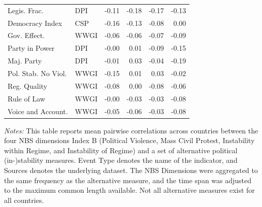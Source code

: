 \begin{table}[htbp]
\begin{minipage}{0.7\linewidth}
\begin{tabular}{llrrrr}
  Legis. Frac. & DPI & -0.11 & -0.18 & -0.17 & -0.13 \\ 
  Democracy Index & CSP & -0.16 & -0.13 & -0.08 & 0.00 \\ 
  Gov. Effect. & WWGI & -0.06 & -0.06 & -0.07 & -0.09 \\ 
  Party in Power & DPI & -0.00 & 0.01 & -0.09 & -0.15 \\ 
  Maj. Party & DPI & -0.01 & 0.03 & -0.04 & -0.19 \\ 
  Pol. Stab. No Viol. & WWGI & -0.15 & 0.01 & 0.03 & -0.02 \\ 
  Reg. Quality & WWGI & -0.08 & 0.00 & -0.08 & -0.06 \\ 
  Rule of Law & WWGI & -0.00 & -0.03 & -0.03 & -0.08 \\ 
  Voice and Account. & WWGI & -0.05 & -0.06 & -0.03 & -0.08 \\ 
\bottomrule
\end{tabular}
\vspace{0.5em}
{\footnotesize \flushleft \textit{Notes:} This table reports mean pairwise correlations across countries between the four NBS dimensions Index B (Political Violence, Mass Civil Protest, Instability within Regime, and Instability of Regime) and a set of alternative political (in-)stability measures. Event Type denotes the name of the indicator, and Sources denotes the underlying dataset. The NBS Dimensions were aggregated to the same frequency as the alternative measure, and the time span was adjusted to the maximum common length available. Not all alternative measures exist for all countries.}
\end{minipage}
\end{table}


